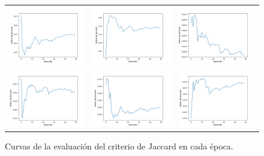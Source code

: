 \begin{figure}[h!]
\begin{tabular}{ccc}
        \includegraphics[width=4.5cm]{../Plots/score_epoch_12.png} &
        \includegraphics[width=4.5cm]{../Plots/score_epoch_13.png} &
        \includegraphics[width=4.5cm]{../Plots/score_epoch_14.png} \\

        \includegraphics[width=4.5cm]{../Plots/score_epoch_15.png} &
        \includegraphics[width=4.5cm]{../Plots/score_epoch_16.png} &
        \includegraphics[width=4.5cm]{../Plots/score_epoch_17.png} \\
    \end{tabular}

    \caption{Curvas de la evaluación del criterio de Jaccard en cada época.}
    \label{fig:iou_epochs}
\end{figure}


